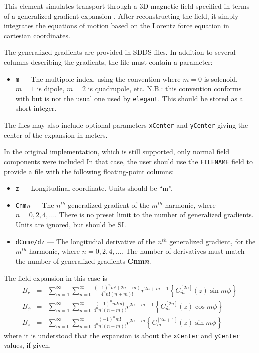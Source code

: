 This element simulates transport through a 3D magnetic field
specified in terms of a generalized gradient expansion \cite{Venturini-NIMA427-387}.
After reconstructing the field, it simply integrates the equations of motion
based on the Lorentz force equation in cartesian coordinates.  

The generalized gradients are provided in SDDS files.
In addition to several columns describing the gradients, the file must contain a parameter:
\begin{itemize}
\item \verb|m| --- The multipole index, using the convention where $m=0$ is solenoid, $m=1$ is dipole, $m=2$ is quadrupole,
  etc. N.B.: this convention conforms with \cite{Venturini-NIMA427-387} but is not the usual one used by
  {\tt elegant}. This should be stored as a short integer.
\end{itemize}
The files may also include optional parameters \verb|xCenter| and \verb|yCenter| giving the center of the expansion
in meters.

In the original implementation, which is still supported, only normal field components were included
In that case, the user should use the \verb|FILENAME| field to provide a file 
with the following floating-point columns:
\begin{itemize}
\item \verb|z| --- Longitudinal coordinate. Units should be ``m''.
\item \verb|Cnm|{\em n} --- The $n^{th}$ generalized gradient of the $m^{th}$ harmonic, where $n=0,2,4,...$.
  There is no preset limit to the number of generalized gradients. Units are ignored,
  but should be SI.
\item \verb|dCnm|{\em n}\verb|/dz| --- The longitudial derivative of the $n^{th}$ generalized gradient, 
  for the $m^{th}$ harmonic, where $n=0,2,4,...$.
  The number of derivatives must match the number of generalized gradients {\bf Cnm{\em n}}.
\end{itemize}
The field expansion in this case is
\begin{equation}
\begin{array}{lcl}
B_r & = & \sum\limits_{m=1}^\infty \sum\limits_{n=0}^\infty \frac{(-1)^n m! (2n + m)}{4^n n! (n+m)!} r^{2 n + m-1}
\left\{C_m^{\left[2n\right]}(z) \sin m\phi\right\}  \\
B_\phi & = & \sum\limits_{m=1}^\infty \sum\limits_{n=0}^\infty \frac{(-1)^n m! m)}{4^n n! (n+m)!} r^{2 n + m-1}
\left\{C_m^{\left[2n\right]}(z) \cos m\phi\right\} \\
B_z & = & \sum\limits_{m=0}^\infty \sum\limits_{n=0}^\infty \frac{(-1)^n m!}{4^n n! (n+m)!} r^{2 n + m}
\left\{C_m^{\left[2n+1\right]}(z) \sin m\phi\right\}
\end{array}
\end{equation}
where it is understood that the expansion is about the {\tt xCenter} and {\tt yCenter} values, if given.


